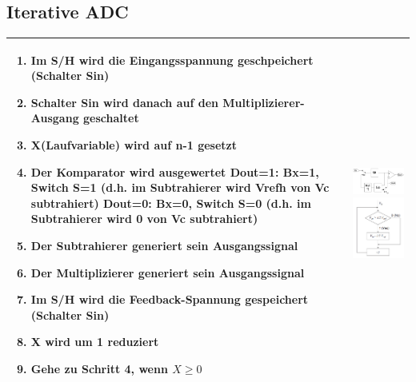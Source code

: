 \subsection{Iterative ADC}
\begin{longtable}{|p{12cm}|p{6cm}|}
  \hline
    \begin{enumerate}
      \item Im S/H wird die Eingangsspannung geschpeichert (Schalter Sin)
      \item Schalter Sin wird danach auf den Multiplizierer-Ausgang geschaltet
      \item X(Laufvariable) wird auf n-1 gesetzt
      \item Der Komparator wird ausgewertet\newline
        Dout=1: Bx=1, Switch S=1 (d.h. im Subtrahierer wird Vrefh von Vc
        subtrahiert)\newline
        Dout=0: Bx=0, Switch S=0 (d.h. im Subtrahierer wird 0 von Vc
        subtrahiert)
      \item Der Subtrahierer generiert sein Ausgangssignal
      \item Der Multiplizierer generiert sein Ausgangssignal
      \item Im S/H wird die Feedback-Spannung gespeichert (Schalter Sin)
      \item X wird um 1 reduziert
      \item Gehe zu Schritt 4, wenn $X\geq0$
    \end{enumerate} &
    \includegraphics[width=4cm, valign=t]{pictures/iterativeADC}\newline
    \includegraphics[width=4cm, valign=t]{pictures/iterativeADC_ablauf}\\
  \hline
\end{longtable}



